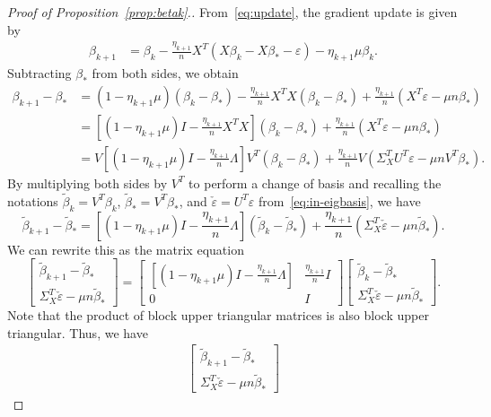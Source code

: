 \documentclass[11pt]{article}
\begin{document}
\begin{proof}[Proof of Proposition~\ref{prop:betak}.]
From~\eqref{eq:update}, the gradient update is given by
\begin{align*}
    \beta_{k+1} 
    &= \beta_k - \frac{\eta_{k+1}}{n}X^T(X\beta_k - X\beta_* - \varepsilon) - \eta_{k+1}\mu \beta_k.
\end{align*}
Subtracting $\beta_*$ from both sides, we obtain
\begin{align*}
    \beta_{k+1} - \beta_* &= (1-\eta_{k+1}\mu)(\beta_k - \beta_*) - \frac{\eta_{k+1}}{n}X^TX(\beta_{k} - \beta_*) +  \frac{\eta_{k+1}}{n}(X^T\varepsilon - \mu n \beta_*)\\
    &= \left[(1-\eta_{k+1}\mu)I - \frac{\eta_{k+1}}{n}X^TX\right](\beta_{k} - \beta_*) +  \frac{\eta_{k+1}}{n}\left(X^T\varepsilon - \mu n \beta_*\right)\\
    &= V\left[(1-\eta_{k+1}\mu)I - \frac{\eta_{k+1}}{n}\Lambda\right]V^T(\beta_k - \beta_*) +  \frac{\eta_{k+1}}{n}V\left(\Sigma_X^TU^T\varepsilon - \mu n V^T\beta_*\right).
\end{align*}
By multiplying both sides by $V^T$ to perform a change of basis and recalling the notations $\tilde{\beta}_k = V^T \beta_k$, $\tilde{\beta}_* = V^T\beta_*$, and $\check{\varepsilon} = U^T \varepsilon$ from~\eqref{eq:in-eigbasis}, we have
\[
    \tilde{\beta}_{k+1} - \tilde{\beta}_* = \left[(1-\eta_{k+1}\mu)I - \frac{\eta_{k+1}}{n}\Lambda\right](\tilde{\beta}_k-\tilde{\beta}_*) + \frac{\eta_{k+1}}{n}\left(\Sigma_X^T\check{\varepsilon} - \mu n \tilde{\beta}_*\right).
\]
We can rewrite this as the matrix equation 
\[
    \begin{bmatrix} \tilde{\beta}_{k+1} - \tilde{\beta}_* \\ \Sigma_X^T\check{\varepsilon} - \mu n \tilde{\beta}_* 
    \end{bmatrix} = \begin{bmatrix} \left[(1-\eta_{k+1}\mu)I - \frac{\eta_{k+1}}{n}\Lambda\right] & \frac{\eta_{k+1}}{n}I \\ 0 & I \end{bmatrix} \begin{bmatrix} \tilde{\beta}_{k} - \tilde{\beta}_* \\ \Sigma_X^T\check{\varepsilon} - \mu n \tilde{\beta}_*
    \end{bmatrix}.
\]
Note that the product of block upper triangular matrices is also block upper triangular.
Thus, we have
\begin{align*}
    \begin{bmatrix} \tilde{\beta}_{k+1} - \tilde{\beta}_* \\ \Sigma_X^T\check{\varepsilon}  - \mu n \tilde{\beta}_* 

\end{bmatrix}
\end{align*}
\end{proof}
\end{document}
